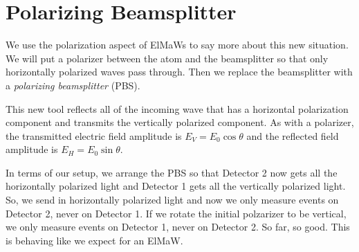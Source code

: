 \section{Polarizing Beamsplitter}
We use the polarization aspect of ElMaWs to say more about this new situation. We will put a polarizer between the atom and the beamsplitter so that only horizontally polarized waves pass through. Then we replace the beamsplitter with a {\em polarizing beamsplitter} (PBS). 
\begin{marginfigure}\centering
{}
\end{marginfigure}
This new tool reflects all of the incoming wave that has a horizontal polarization component and transmits the vertically polarized component. As with a polarizer, the transmitted electric field amplitude is $E_V = E_0 \cos\theta$ and the reflected field amplitude is $E_H = E_0 \sin\theta$. 

In terms of our setup, we arrange the PBS so that Detector 2 now gets all the horizontally polarized light and Detector 1 gets all the vertically polarized light. So, we send in horizontally polarized light and now we only measure events on Detector 2, never on Detector 1. If we rotate the initial polzarizer to be vertical, we only measure events on Detector 1, never on Detector 2. So far, so good. This is behaving like we expect for an ElMaW.

